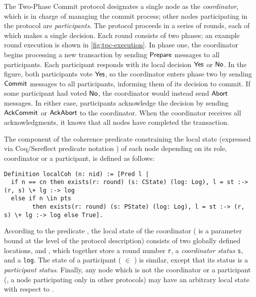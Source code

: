 The Two-Phase Commit protocol designates a single node as the
\emph{coordinator}, which is in charge of managing the commit process;
other nodes participating in the protocol are \emph{participants}.
%
The protocol proceeds in a series of rounds, each of which makes a
single decision.
%
Each round consists of two phases; an example round execution is
shown in \cref{fig:tpc-execution}.
%
In phase one, the coordinator begins processing a new transaction by sending
$\mathsf{Prepare}$ messages to all participants.
%
Each participant responds with its local decision $\mathsf{Yes}$ or $\mathsf{No}$.
%
In the figure, both participants vote $\mathsf{Yes}$, so the coordinator
enters phase two by sending $\mathsf{Commit}$ messages to all participants,
informing them of its decision to commit.
%
If some participant had voted $\mathsf{No}$, the coordinator would instead
send $\mathsf{Abort}$ messages.
%
In either case, participants acknowledge the decision by sending
$\mathsf{AckCommit}$ or $\mathsf{AckAbort}$ to the coordinator.
%
When the coordinator receives all acknowledgments, it knows that all
nodes have completed the transaction.

The component of the coherence predicate constraining the local state
 (expressed via Coq/Ssreflect predicate notation \code{[Pred l
  | ...]}) of each node  depending on its role, coordinator or
a participant, is defined as follows:


\begin{lstlisting}[basicstyle=\footnotesize\ttfamily]
Definition localCoh (n: nid) := [Pred l |
  if n == cn then exists(r: round) (s: CState) (log: Log), l = st :-> (r, s) \+ lg :-> log
  else if n \in pts
        then exists(r: round) (s: PState) (log: Log), l = st :-> (r, s) \+ lg :-> log else True].
\end{lstlisting}
%
%
According to the predicate , the local state of the
coordinator ( is a parameter bound at the level of the
protocol description) consists of two globally defined locations,
 and , which together store a round number
\texttt{r}, a \emph{coordinator status} \texttt{s}, and a
\texttt{log}.
%
The state of a participant ( $\in$ ) is similar, except
that its status is a \emph{participant status}.
%
Finally, any node which is not the coordinator or a participant (\eg,
a node participating only in other protocols) may have an arbitrary
local state with respect to .

